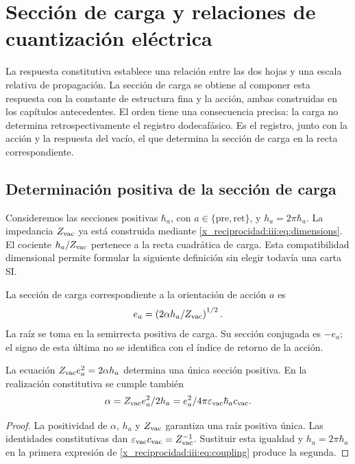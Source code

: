 

\chapter{Sección de carga y relaciones de cuantización eléctrica}
\label{x_reciprocidad:iii:sec:carga}

La respuesta constitutiva establece una relación entre las dos hojas y una
escala relativa de propagación. La sección de carga se obtiene al componer
esta respuesta con la constante de estructura fina y la acción, ambas
construidas en los capítulos antecedentes. El orden tiene una consecuencia
precisa: la carga no determina retrospectivamente el registro dodecafásico.
Es el registro, junto con la acción y la respuesta del vacío, el que
determina la sección de carga en la recta correspondiente.

\section{Determinación positiva de la sección de carga}

Consideremos las secciones positivas $\hbar_a$, con
$a\in\{\mathrm{pre},\mathrm{ret}\}$, y $h_a=2\pi\hbar_a$.
La impedancia $Z_{\rm vac}$ ya está construida mediante
\eqref{x_reciprocidad:iii:eq:dimensions}. El cociente $h_a/Z_{\rm vac}$ pertenece a
la recta cuadrática de carga. Esta compatibilidad dimensional permite
formular la siguiente definición sin elegir todavía una carta SI.

\begin{definition}
La sección de carga correspondiente a la orientación de acción $a$ es
\begin{equation}
 e_a=\left(\frac{2\alpha h_a}{Z_{\rm vac}}\right)^{1/2}.
 \label{x_reciprocidad:iii:eq:charge}
\end{equation}
La raíz se toma en la semirrecta positiva de carga. Su sección conjugada
es $-e_a$; el signo de esta última no se identifica con el índice de
retorno de la acción.
\end{definition}

\begin{proposition}
La ecuación $Z_{\rm vac}e_a^2=2\alpha h_a$ determina una única sección
positiva. En la realización constitutiva se cumple también
\begin{equation}
 \alpha=\frac{Z_{\rm vac}e_a^2}{2h_a}
 =\frac{e_a^2}{4\pi\varepsilon_{\rm vac}\hbar_a c_{\rm vac}}.
 \label{x_reciprocidad:iii:eq:coupling}
\end{equation}
\end{proposition}
\begin{proof}
La positividad de $\alpha$, $h_a$ y $Z_{\rm vac}$ garantiza una raíz
positiva única. Las identidades constitutivas dan
$\varepsilon_{\rm vac}c_{\rm vac}=Z_{\rm vac}^{-1}$.
Sustituir esta igualdad y $h_a=2\pi\hbar_a$ en la primera expresión
de \eqref{x_reciprocidad:iii:eq:coupling} produce la segunda.
\end{proof}

